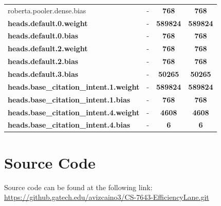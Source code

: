 \documentclass[10pt,twocolumn,letterpaper]{article}
\begin{document}
\begin{table}[htbp]
\begin{tabular}{|l|c|c|c|}
        roberta.pooler.dense.bias & - & \color{purple}\textbf{768} & \color{blue}\textbf{768} \\
        \textbf{heads.default.0.weight} & - & \color{purple}\textbf{589824} & \color{blue}\textbf{589824} \\
        \textbf{heads.default.0.bias} & - & \color{purple}\textbf{768} & \color{blue}\textbf{768} \\
        \textbf{heads.default.2.weight} & - & \color{purple}\textbf{768} & \color{blue}\textbf{768} \\
        \textbf{heads.default.2.bias} & - & \color{purple}\textbf{768} & \color{blue}\textbf{768} \\
        \textbf{heads.default.3.bias} & - & \color{purple}\textbf{50265} & \color{blue}\textbf{50265} \\
        \textbf{heads.base\_citation\_intent.1.weight} & - & \color{purple}\textbf{589824} & \color{blue}\textbf{589824} \\
        \textbf{heads.base\_citation\_intent.1.bias} & - & \color{purple}\textbf{768} & \color{blue}\textbf{768} \\
        \textbf{heads.base\_citation\_intent.4.weight} & - & \color{purple}\textbf{4608} & \color{blue}\textbf{4608} \\
        \textbf{heads.base\_citation\_intent.4.bias} & - & \color{purple}\textbf{6} & \color{blue}\textbf{6} \\
        \hline
    \end{tabular}
    \label{table:model_layers_table}
\end{table}





\section{Source Code}
Source code can be found at the following link:
\href{https://github.gatech.edu/avizcaino3/CS-7643-EfficiencyLane.git}{https://github.gatech.edu/avizcaino3/CS-7643-EfficiencyLane.git}

{\small


}
\end{document}
